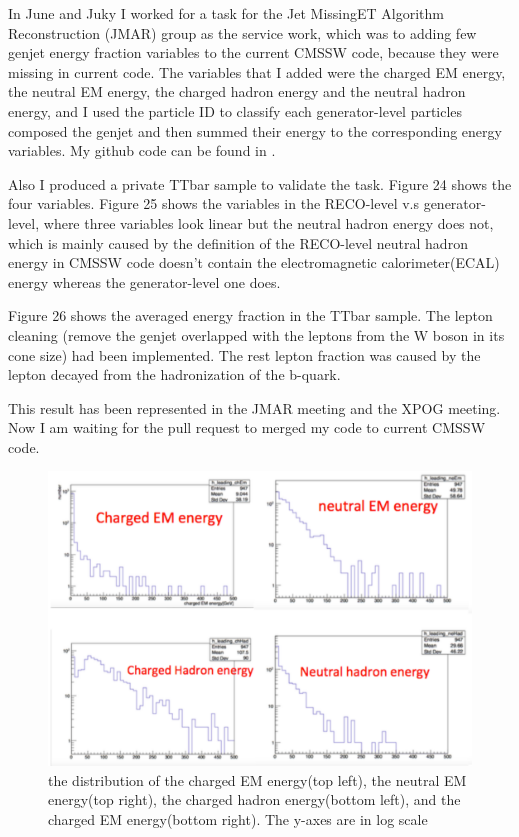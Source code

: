 \documentclass{article}
\begin{document}
In June and Juky I worked for a task for the Jet MissingET Algorithm Reconstruction (JMAR) group as the service work, which was to adding few genjet energy fraction variables to the current CMSSW code, because they were missing in current code. The variables that I added were the charged EM energy, the neutral EM energy, the charged hadron energy and the neutral hadron energy, and I used the particle ID to classify each generator-level particles composed the genjet and then summed their energy to the corresponding energy variables. My github code can be found in \cite{JETMET my git code}.  

Also I produced a private TTbar sample to validate the task. Figure 24 shows the four variables. Figure 25 shows the variables in the RECO-level v.s generator-level, where three variables look linear but the neutral hadron energy does not, which is mainly caused by the definition of the RECO-level neutral hadron energy in CMSSW code doesn't contain the electromagnetic calorimeter(ECAL) energy whereas the generator-level one does.  

Figure 26 shows the averaged energy fraction in the TTbar sample. The lepton cleaning (remove the genjet overlapped with the leptons from the W boson in its cone size) had been implemented. The rest lepton fraction was caused by the lepton decayed from the hadronization of the b-quark.  

This result has been represented in the JMAR meeting and the XPOG meeting. Now I am waiting for the pull request to merged my code to current CMSSW code.


\begin{figure}
\centering
\includegraphics[width=.7\textwidth]{figures/genjet_variables.pdf}
\caption{the distribution of the charged EM energy(top left), the neutral EM energy(top right), the charged hadron energy(bottom left), and the charged EM energy(bottom right). The y-axes are in log scale}
\label{pics:blablabla}
\end{figure}
\end{document}
